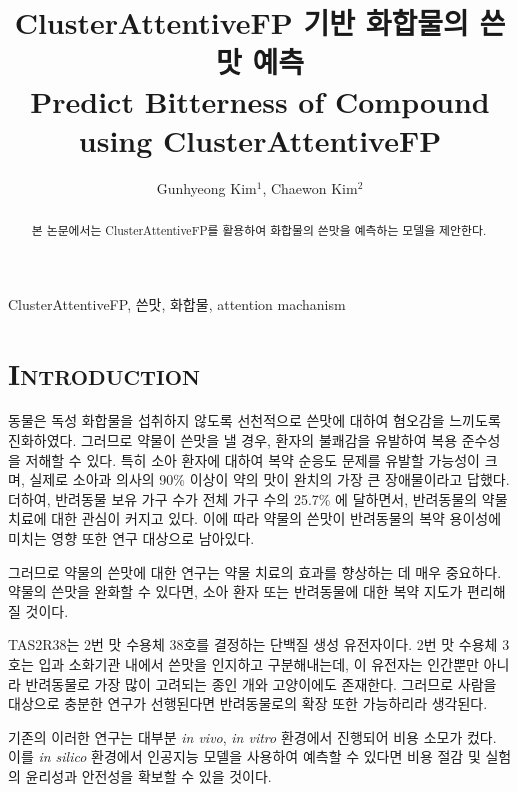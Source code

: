 \documentclass[9pt]{ieeeconf}
\begin{document}
\title{ClusterAttentiveFP 기반 화합물의 쓴맛 예측\\
        \large Predict Bitterness of Compound using ClusterAttentiveFP}

\author{Gunhyeong Kim$^{1}$, Chaewon Kim$^{2}$}
\maketitle
    \begin{abstract}
        본 논문에서는 ClusterAttentiveFP를 활용하여 화합물의 쓴맛을 예측하는 모델을 제안한다.
    \end{abstract}
    \begin{keywords}
        ClusterAttentiveFP, 쓴맛, 화합물, attention machanism
    \end{keywords}


\section[short]{\Large {\textsc{Introduction}}}
    
\indent 동물은 독성 화합물을 섭취하지 않도록 선천적으로 쓴맛에 대하여 혐오감을 느끼도록 진화하였다.
그러므로 약물이 쓴맛을 낼 경우, 환자의 불쾌감을 유발하여 복용 준수성을 저해할 수 있다\cite{dagan2017bitter}.
특히 소아 환자에 대하여 복약 순응도 문제를 유발할 가능성이 크며\cite{bahia2018bitterness},
실제로 소아과 의사의 90\% 이상이 약의 맛이 완치의 가장 큰 장애물이라고 답했다\cite{mennella2013bad}.
더하여, 반려동물 보유 가구 수가 전체 가구 수의 25.7\% 에 달하면서, 반려동물의 약물 치료에 대한 관심이 커지고 있다.
이에 따라 약물의 쓴맛이 반려동물의 복약 용이성에 미치는 영향 또한 연구 대상으로 남아있다.

\indent 그러므로 약물의 쓴맛에 대한 연구는 약물 치료의 효과를 향상하는 데 매우 중요하다.
약물의 쓴맛을 완화할 수 있다면, 소아 환자 또는 반려동물에 대한 복약 지도가 편리해질 것이다.

\indent TAS2R38는 2번 맛 수용체 38호를 결정하는 단백질 생성 유전자이다.
2번 맛 수용체 3호는 입과 소화기관 내에서 쓴맛을 인지하고 구분해내는데, 이 유전자는 인간뿐만 아니라 반려동물로 가장 많이 고려되는 종인 개와 고양이에도 존재한다.
그러므로 사람을 대상으로 충분한 연구가 선행된다면 반려동물로의 확장 또한 가능하리라 생각된다.

\indent 기존의 이러한 연구는 대부분 \textit{in vivo}, \textit{in vitro} 환경에서 진행되어 비용 소모가 컸다.
이를 \textit{in silico} 환경에서 인공지능 모델을 사용하여 예측할 수 있다면 비용 절감 및 실험의 윤리성과 안전성을 확보할 수 있을 것이다.
\end{document}
